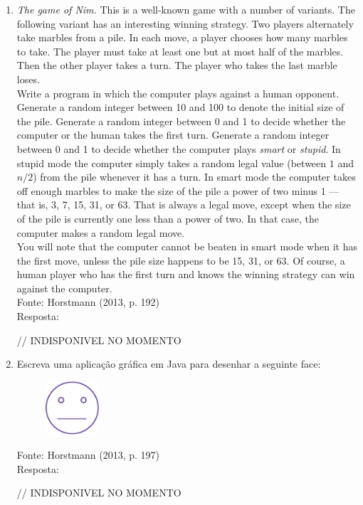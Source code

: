 \documentclass[onecolumn,a4paper,10pt]{report}
\newcommand{\+}{\, + \,}
\newcommand{\<}{\hspace*{-0.4cm}}
\begin{document}
\begin{enumerate}[1.]
\item \emph{The game of Nim.} This is a well-known game with a number of variants. The following variant has an interesting winning strategy. Two players alternately take
marbles from a pile. In each move, a player chooses how many marbles to take. The
player must take at least one but at most half of the marbles. Then the other player
takes a turn. The player who takes the last marble loses.\\
Write a program in which the computer plays against a human opponent. Generate a
random integer between 10 and 100 to denote the initial size of the pile. Generate a
random integer between 0 and 1 to decide whether the computer or the human takes
the first turn. Generate a random integer between 0 and 1 to decide whether the
computer plays \emph{smart} or \emph{stupid}. In stupid mode the computer simply takes a random
legal value (between $1$ and $n/2$) from the pile whenever it has a turn. In smart mode
the computer takes off enough marbles to make the size of the pile a power of two
minus 1 — that is, 3, 7, 15, 31, or 63. That is always a legal move, except when the size
of the pile is currently one less than a power of two. In that case, the computer makes a random legal move.\\
You will note that the computer cannot be beaten in smart mode when it has the first
move, unless the pile size happens to be 15, 31, or 63. Of course, a human player who
has the first turn and knows the winning strategy can win against the computer.\\
{\tiny Fonte: Horstmann (2013, p. 192)}\\
Resposta:\\
\begin{javacode}
// INDISPONIVEL NO MOMENTO
\end{javacode}

\item Escreva uma aplicação gráfica em Java para desenhar a seguinte face:
\begin{figure}[h]
	\includegraphics[height=2cm,center]{pucrs-ep-fprog-unidade_04-graficos_em_java-laminas-exercicio_1.png}
\end{figure}
{\tiny Fonte: Horstmann (2013, p. 197)}\\
Resposta:\\
\begin{javacode}
// INDISPONIVEL NO MOMENTO
\end{javacode}


\end{enumerate}
\end{document}
